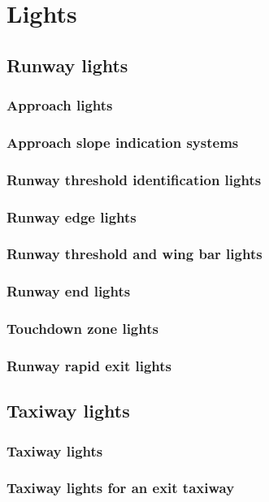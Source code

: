 \chapter{Lights} %

	\section{Runway lights}
		\subsection{Approach lights}
		\subsection{Approach slope indication systems}
		\subsection{Runway threshold identification lights}
		\subsection{Runway edge lights}
		\subsection{Runway threshold and wing bar lights} %
		\subsection{Runway end lights}
		\subsection{Touchdown zone lights}
		\subsection{Runway rapid exit lights}
	
	\section{Taxiway lights}
		\subsection{Taxiway lights}
		\subsection{Taxiway lights for an exit taxiway}
